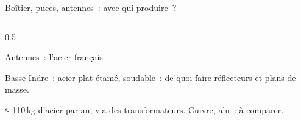 \begin{frame}{Boîtier, puces, antennes~: avec qui produire~?}
\begin{columns}[T]
\begin{column}{0.5\textwidth}
\begin{encadre}{Antennes~: l'acier français}
\begin{puces}
          \item Basse-Indre~: acier plat étamé, soudable~: de quoi faire réflecteurs et plans de masse.
          \item ≈ 110\,kg d'acier par an, via des transformateurs. Cuivre, alu~: à comparer.
        \end{puces}
      \end{encadre}
    \end{column}
  \end{columns}
\end{frame}
